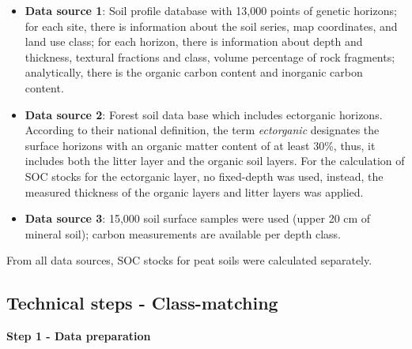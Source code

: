 \documentclass[10pt,b5paper,]{book}
\theoremstyle{definition}
\theoremstyle{definition}
\theoremstyle{definition}
\theoremstyle{remark}
\begin{document}
\begin{itemize}
\item
  \textbf{Data source 1}: Soil profile database with 13,000 points of
  genetic horizons; for each site, there is information about the soil
  series, map coordinates, and land use class; for each horizon, there
  is information about depth and thickness, textural fractions and
  class, volume percentage of rock fragments; analytically, there is the
  organic carbon content and inorganic carbon content.
\item
  \textbf{Data source 2}: Forest soil data base which includes
  ectorganic horizons. According to their national definition, the term
  \emph{ectorganic} designates the surface horizons with an organic
  matter content of at least 30\%, thus, it includes both the litter
  layer and the organic soil layers. For the calculation of SOC stocks
  for the ectorganic layer, no fixed-depth was used, instead, the
  measured thickness of the organic layers and litter layers was
  applied.
\item
  \textbf{Data source 3}: 15,000 soil surface samples were used (upper
  20 cm of mineral soil); carbon measurements are available per depth
  class.
\end{itemize}

From all data sources, SOC stocks for peat soils were calculated
separately.

\hypertarget{technical-steps---class-matching}{%
\subsection{Technical steps -
Class-matching}\label{technical-steps---class-matching}}

\textbf{Step 1 - Data preparation}
\end{document}

